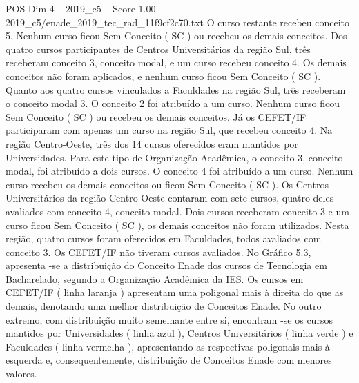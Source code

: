 \begin{textsample}{POS Dim 4 – 2019\_c5 – Score 1.00 – 2019\_c5/enade\_2019\_tec\_rad\_11f9cf2c70.txt}
O curso restante recebeu conceito 5.
Nenhum curso ficou Sem Conceito ( SC ) ou recebeu os demais conceitos.
Dos quatro cursos participantes de Centros Universitários da região Sul, três receberam conceito 3, conceito modal, e um curso recebeu conceito 4.
Os demais conceitos não foram aplicados, e nenhum curso ficou Sem Conceito ( SC ).
Quanto aos quatro cursos vinculados a Faculdades na região Sul, três receberam o conceito modal 3.
O conceito 2 foi atribuído a um curso.
Nenhum curso ficou Sem Conceito ( SC ) ou recebeu os demais conceitos.
Já os CEFET/IF participaram com apenas um curso na região Sul, que recebeu conceito 4.
Na região Centro-Oeste, três dos 14 cursos oferecidos eram mantidos por Universidades.
Para este tipo de Organização Acadêmica, o conceito 3, conceito modal, foi atribuído a dois cursos.
O conceito 4 foi atribuído a um curso.
Nenhum curso recebeu os demais conceitos ou ficou Sem Conceito ( SC ).
Os Centros Universitários da região Centro-Oeste contaram com sete cursos, quatro deles avaliados com conceito 4, conceito modal.
Dois cursos receberam conceito 3 e um curso ficou Sem Conceito ( SC ), os demais conceitos não foram utilizados.
Nesta região, quatro cursos foram oferecidos em Faculdades, todos avaliados com conceito 3.
Os CEFET/IF não tiveram cursos avaliados.
No Gráfico 5.3, apresenta -se a distribuição do Conceito Enade dos cursos de Tecnologia em Bacharelado, segundo a Organização Acadêmica da IES.
Os cursos em CEFET/IF ( linha laranja ) apresentam uma poligonal mais à direita do que as demais, denotando uma melhor distribuição de Conceitos Enade.
No outro extremo, com distribuição muito semelhante entre si, encontram -se os cursos mantidos por Universidades ( linha azul ), Centros Universitários ( linha verde ) e Faculdades ( linha vermelha ), apresentando as respectivas poligonais mais à esquerda e, consequentemente, distribuição de Conceitos Enade com menores valores.

\end{textsample}
